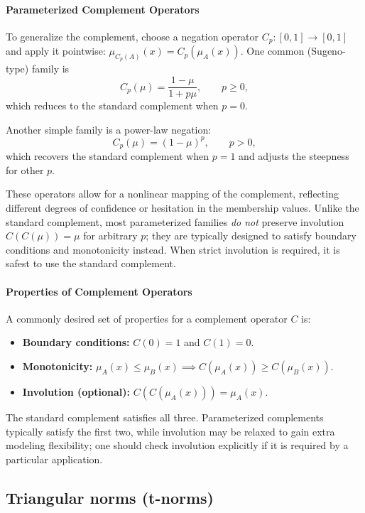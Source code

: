 \paragraph{Parameterized Complement Operators}
To generalize the complement, choose a negation operator \(C_p:[0,1]\to[0,1]\) and apply it pointwise: \(\mu_{C_p(A)}(x)=C_p(\mu_A(x))\). One common (Sugeno-type) family is
\[
    C_p(\mu) = \frac{1 - \mu}{1 + p \mu}, \qquad p \ge 0,
\]
which reduces to the standard complement when \(p=0\).

Another simple family is a power-law negation:
\[
    C_p(\mu) = (1 - \mu)^{p}, \qquad p > 0,
\]
which recovers the standard complement when \(p=1\) and adjusts the steepness for other \(p\).

These operators allow for a nonlinear mapping of the complement, reflecting different degrees of confidence or hesitation in the membership values. Unlike the standard complement, most parameterized families \emph{do not} preserve involution \(C(C(\mu))=\mu\) for arbitrary \(p\); they are typically designed to satisfy boundary conditions and monotonicity instead. When strict involution is required, it is safest to use the standard complement.

\paragraph{Properties of Complement Operators}
A commonly desired set of properties for a complement operator \( C \) is:
\begin{itemize}
    \item \textbf{Boundary conditions:} \( C(0) = 1 \) and \( C(1) = 0 \).
    \item \textbf{Monotonicity:} \( \mu_A(x) \leq \mu_B(x) \implies C(\mu_A(x)) \geq C(\mu_B(x)) \).
    \item \textbf{Involution (optional):} \( C(C(\mu_A(x))) = \mu_A(x) \).
\end{itemize}

The standard complement satisfies all three. Parameterized complements typically satisfy the first two, while involution may be relaxed to gain extra modeling flexibility; one should check involution explicitly if it is required by a particular application.

\subsection{Triangular norms (t\hyp{}norms)}
\label{sec:fuzzysets_triangular_norms_t_norms}

